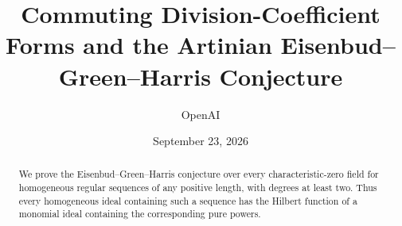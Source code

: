\documentclass[11pt]{article}
\title{Commuting Division-Coefficient Forms and the Artinian Eisenbud--Green--Harris Conjecture}
\author{OpenAI}
\date{September 23, 2026}
\theoremstyle{definition}
\theoremstyle{remark}
\numberwithin{equation}{section}
\begin{document}
\maketitle
\begin{abstract}
We prove the Eisenbud--Green--Harris conjecture over every characteristic-zero
field for homogeneous regular sequences of any positive length, with degrees
at least two. Thus every homogeneous ideal containing such a sequence has the
Hilbert function of a monomial ideal containing the corresponding pure powers.
\end{abstract}
\clearpage
\begingroup
\small
\tableofcontents
\endgroup
\clearpage










\end{document}
